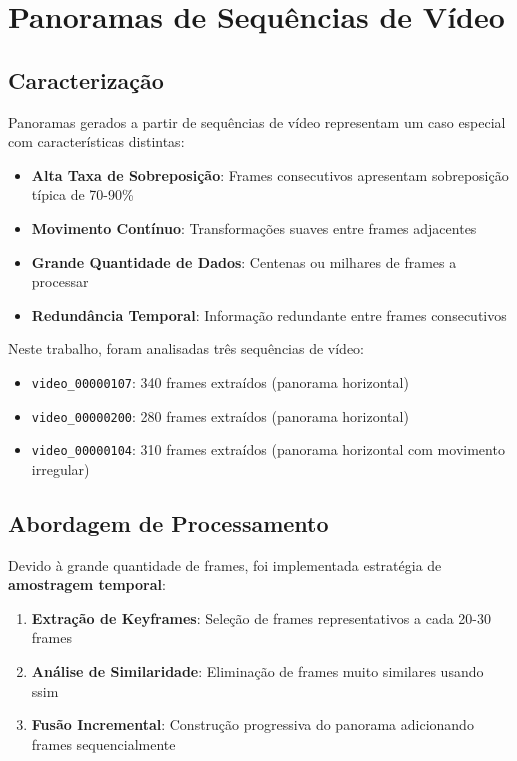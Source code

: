 \section{Panoramas de Sequências de Vídeo}

\subsection{Caracterização}

Panoramas gerados a partir de sequências de vídeo representam um caso especial com características distintas:

\begin{itemize}
    \item \textbf{Alta Taxa de Sobreposição}: Frames consecutivos apresentam sobreposição típica de 70-90\%
    \item \textbf{Movimento Contínuo}: Transformações suaves entre frames adjacentes
    \item \textbf{Grande Quantidade de Dados}: Centenas ou milhares de frames a processar
    \item \textbf{Redundância Temporal}: Informação redundante entre frames consecutivos
\end{itemize}

Neste trabalho, foram analisadas três sequências de vídeo:

\begin{itemize}
    \item \texttt{video\_00000107}: 340 frames extraídos (panorama horizontal)
    \item \texttt{video\_00000200}: 280 frames extraídos (panorama horizontal)
    \item \texttt{video\_00000104}: 310 frames extraídos (panorama horizontal com movimento irregular)
\end{itemize}

\subsection{Abordagem de Processamento}

Devido à grande quantidade de frames, foi implementada estratégia de \textbf{amostragem temporal}:

\begin{enumerate}
    \item \textbf{Extração de Keyframes}: Seleção de frames representativos a cada 20-30 frames
    \item \textbf{Análise de Similaridade}: Eliminação de frames muito similares usando \gls{ssim}
    \item \textbf{Fusão Incremental}: Construção progressiva do panorama adicionando frames sequencialmente
\end{enumerate}

